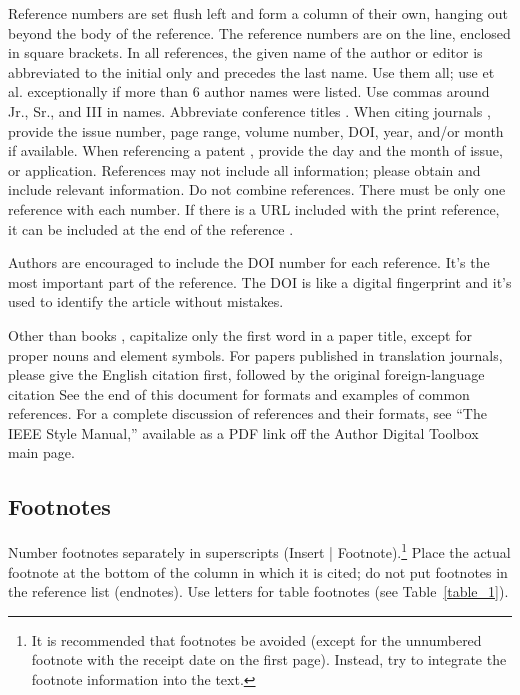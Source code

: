 \documentclass[journal]{IEEEtranTICPS}
\begin{document}
Reference numbers are set flush left and form a column of their own, hanging out beyond the body of the reference. The reference numbers are on the line, enclosed in square brackets. In all references, the given name of the author or editor is abbreviated to the initial only and precedes the last name. Use them all; use et al. exceptionally if more than 6 author names were listed. Use commas around Jr., Sr., and III in names. Abbreviate conference titles \cite{inproceedings1}.  When citing journals \cite{article1, article2, article3, article4, article5, article6, article7, article8, article9, article10}, provide the issue number, page range, volume number, DOI, year, and/or month if available. When referencing a patent \cite{patent1}, provide the day and the month of issue, or application. References may not include all information; please obtain and include relevant information. Do not combine references. There must be only one reference with each number. If there is a URL included with the print reference, it can be included at the end of the reference \cite{onlinebook1}.

Authors are encouraged to include the DOI number for each reference. It's the most important part of the reference. The DOI is like a digital fingerprint and it's used to identify the article without mistakes.

Other than books \cite{inbook1, book1, book2, book3}, capitalize only the first word in a paper title, except for proper nouns and element symbols. For papers published in translation journals, please give the English citation first, followed by the original foreign-language citation See the end of this document for formats and examples of common references. For a complete discussion of references and their formats, see ``The IEEE Style Manual,'' available as a PDF link off the Author Digital Toolbox main page.

\subsection{Footnotes}
Number footnotes separately in superscripts (Insert | Footnote).\footnote{It is recommended that footnotes be avoided (except for the unnumbered footnote with the receipt date on the first page). Instead, try to integrate the footnote information into the text.}  Place the actual footnote at the bottom of the column in which it is cited; do not put footnotes in the reference list (endnotes). Use letters for table footnotes  (see \mbox{Table \ref{table_1}}).
\end{document}

